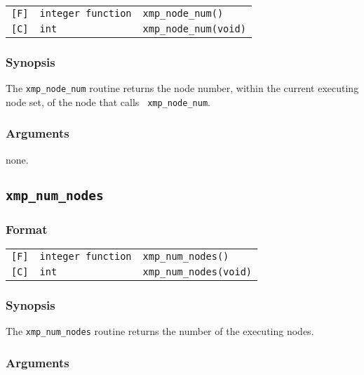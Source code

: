 \begin{tabular}{lll}

\verb![F]!&  {\tt integer function}& {\tt xmp\_node\_num()}\\

\verb![C]!&  {\tt int}& {\tt xmp\_node\_num(void)}

\end{tabular}

\subsubsection*{Synopsis}

     The {\tt xmp\_node\_num} routine returns the node number,
     within the current executing node set, of the node that calls {\tt
     xmp\_node\_num}.

\subsubsection*{Arguments}

none.


\subsection{\tt xmp\_num\_nodes}

\subsubsection*{Format}

\begin{tabular}{lll}

\verb![F]!&  {\tt integer function}& {\tt xmp\_num\_nodes()}\\

\verb![C]!&  {\tt int}& {\tt xmp\_num\_nodes(void)}

\end{tabular}

\subsubsection*{Synopsis}

     The {\tt xmp\_num\_nodes} routine returns the number of the
     executing nodes.

\subsubsection*{Arguments}

